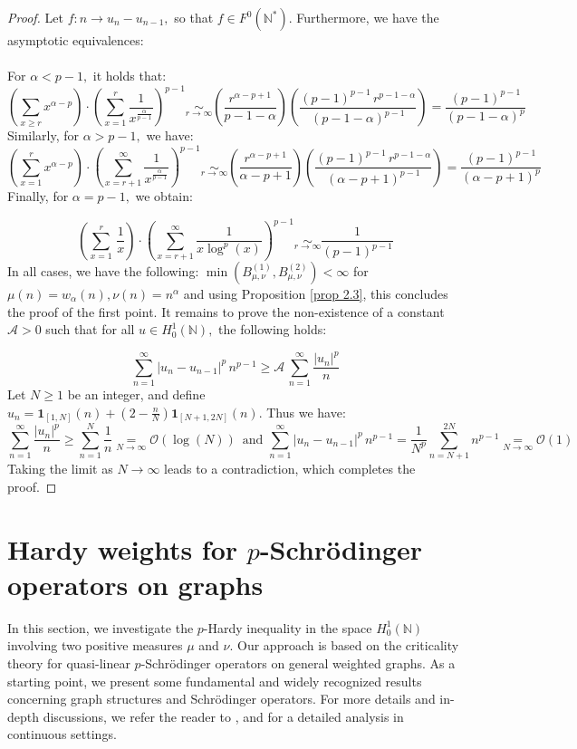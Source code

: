 \documentclass[11pt]{amsart}
\newcommand{\1}{[1]}
\begin{document}
\begin{proof} Let $f: n \to u_{n}-u_{n-1},$ so that $f \in F^{0}(\mathbb{N}^{*}).$ Furthermore, we have the asymptotic equivalences:\\ \\
For $\alpha <p-1,$ it holds that:
$$\left( \sum_{x \geq r} x^{\alpha-p} \right) \cdot \left( \sum_{x = 1}^{r} \frac{1}{x^{\frac{\alpha}{p-1}}} \right)^{p-1} \underset{r \to \infty}{\sim}  \left( \frac{r^{\alpha-p+1}}{p-1-\alpha} \right)    \left( \frac{(p-1)^{p-1} \, r^{p-1-\alpha}}{(p-1-\alpha)^{p-1}} \right) = \frac{(p-1)^{p-1}}{(p-1-\alpha)^{p}} $$ 
Similarly, for $\alpha > p-1,$ we have:
$$\left( \sum_{x=1}^{r} x^{\alpha-p} \right) \cdot \left( \sum_{x = r+1}^{\infty} \frac{1}{x^{\frac{\alpha}{p-1}}} \right)^{p-1} \underset{r \to \infty}{\sim}  \left( \frac{r^{\alpha-p+1}}{\alpha-p+1} \right)    \left( \frac{(p-1)^{p-1} \, r^{p-1-\alpha}}{(\alpha-p+1)^{p-1}} \right) = \frac{(p-1)^{p-1}}{(\alpha-p+1)^{p}} $$ 
Finally, for $\alpha=p-1,$ we obtain:

$$\left( \sum_{x=1}^{r} \, \frac{1}{x} \right) \cdot \left( \sum_{x = r+1}^{\infty} \frac{1}{x \log^p(x) } \right)^{p-1} \underset{r \to \infty}{\sim} \frac{1}{(p-1)^{p-1}} $$
In all cases, we have the following:
$ \min(B_{\mu,\nu}^{(1)}, B_{\mu,\nu}^{(2)}) < \infty $ for
$\mu(n)=w_{\alpha}(n), \nu(n)=n^{\alpha}$ and using Proposition \ref{prop 2.3}, this concludes the proof of the first point. It remains to prove the non-existence of a constant $\mathcal{A}>0$ such that for all $u \in H_{0}^{1}(\mathbb{N}),$ the following holds:

$$\sum_{n=1}^{\infty} |u_{n}-u_{n-1}|^p \, n^{p-1} \geq  \mathcal{A} \, \sum_{n=1}^{\infty} \frac{|u_n|^p} {n}$$
Let $N\geq 1$ be an integer, and define $u_{n}= \mathbf{1}_{[1,N]}(n) + (2-\frac{n}{N}) \mathbf{1}_{[N+1,2N]} (n).$ Thus we have:
$$ \sum_{n=1}^{\infty} \frac{|u_n|^p}{n} \geq  \sum_{n=1}^{N} \frac{1}{n}\underset{N \to \infty}{=} \mathcal{O}(\log(N))
\, \, \, \text{and} \, \, \sum_{n=1}^{\infty} |u_{n}-u_{n-1}|^p \, n^{p-1} =  \frac{1}{N^p} \sum_{n=N+1}^{2N} n^{p-1} \underset{N \to \infty}{=} \mathcal{O}(1)
$$
Taking the limit as $N\to \infty$ leads to a contradiction, which completes the proof.
\end{proof}
\section{\label{sec 3} Hardy weights for $p$-Schrödinger operators on graphs}
In this section, we investigate the 
$p$-Hardy inequality in the space $H_0^1(\mathbb{N})$ involving two positive measures $\mu$ and $\nu$. Our approach is based on the criticality theory for quasi-linear $p$-Schrödinger operators on general weighted graphs. As a starting point, we present some fundamental and widely recognized results concerning graph structures and Schrödinger operators. For more details and in-depth discussions, we refer the reader to  \cite{Fis24}, and \cite{Ver21} for a detailed analysis in continuous settings.
\end{document}
